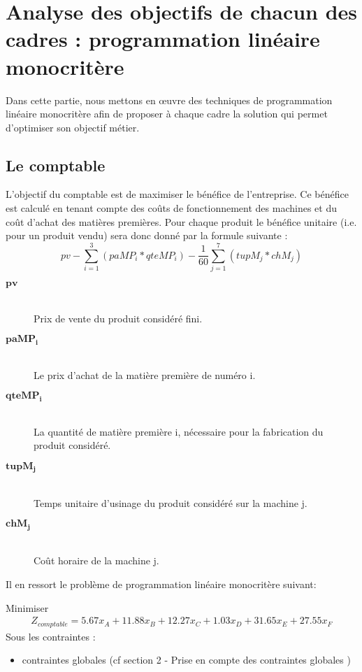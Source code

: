 \documentclass[12pt]{article}
\begin{document}
\section{Analyse des objectifs de chacun des cadres : programmation linéaire monocritère}
Dans cette partie, nous mettons en œuvre des techniques de programmation linéaire monocritère afin de proposer à chaque cadre la solution qui permet d'optimiser son objectif métier.
\subsection{Le comptable}
L'objectif du comptable est de maximiser le bénéfice de l'entreprise. Ce bénéfice est calculé en tenant compte des coûts de fonctionnement des machines et du coût d'achat des matières premières. Pour chaque produit le bénéfice unitaire (i.e. pour un produit vendu) sera donc donné par la formule suivante : 
\begin{equation*} 
pv - \sum_{i=1}^{3}(paMP_{i} * qteMP_{i}) - \frac{1}{60} \sum_{j=1}^{7}(tupM_{j} * chM_{j})  
\end{equation*}
\begin{description}
\item[$\boldsymbol{pv}$]\hfill \\Prix de vente du produit considéré fini.
\item[$\boldsymbol{paMP_{i}}$]\hfill \\ Le prix d'achat de la matière première de numéro i.
\item[$\boldsymbol{qteMP_{i}}$]\hfill \\ La quantité de matière première i, nécessaire pour la fabrication du produit considéré.
\item[$\boldsymbol{tupM_{j}}$]\hfill \\ Temps unitaire d'usinage du produit considéré sur la machine j.
\item[$\boldsymbol{chM_{j}}$]\hfill \\ Coût horaire de la machine j.
\end{description}
Il en ressort le problème de programmation linéaire monocritère suivant:
\begin{tcolorbox}
Minimiser
\begin{align*}
Z_{comptable}= 5.67x_{A} +11.88x_{B} +12.27x_{C} +1.03x_{D} +31.65x_{E} +27.55x_{F}
\end{align*}
Sous les contraintes :
\begin{itemize}
\item contraintes globales (cf section 2 - Prise en compte des contraintes globales )
\end{itemize}
\end{tcolorbox}
\end{document}
